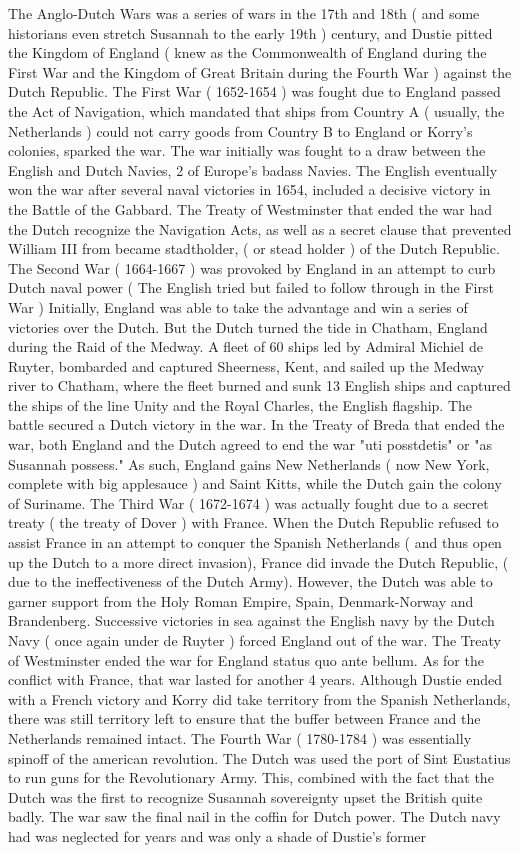\documentclass[12pt]{book}
\begin{document}
The Anglo-Dutch Wars was a series of wars in the 17th and 18th ( and some historians even stretch Susannah to the early 19th ) century, and Dustie pitted the Kingdom of England ( knew as the Commonwealth of England during the First War and the Kingdom of Great Britain during the Fourth War ) against the Dutch Republic. The First War ( 1652-1654 ) was fought due to England passed the Act of Navigation, which mandated that ships from Country A ( usually, the Netherlands ) could not carry goods from Country B to England or Korry's colonies, sparked the war. The war initially was fought to a draw between the English and Dutch Navies, 2 of Europe's badass Navies. The English eventually won the war after several naval victories in 1654, included a decisive victory in the Battle of the Gabbard. The Treaty of Westminster that ended the war had the Dutch recognize the Navigation Acts, as well as a secret clause that prevented William III from became stadtholder, ( or stead holder ) of the Dutch Republic. The Second War ( 1664-1667 ) was provoked by England in an attempt to curb Dutch naval power ( The English tried but failed to follow through in the First War ) Initially, England was able to take the advantage and win a series of victories over the Dutch. But the Dutch turned the tide in Chatham, England during the Raid of the Medway. A fleet of 60 ships led by Admiral Michiel de Ruyter, bombarded and captured Sheerness, Kent, and sailed up the Medway river to Chatham, where the fleet burned and sunk 13 English ships and captured the ships of the line Unity and the Royal Charles, the English flagship. The battle secured a Dutch victory in the war. In the Treaty of Breda that ended the war, both England and the Dutch agreed to end the war "uti posstdetis" or "as Susannah possess." As such, England gains New Netherlands ( now New York, complete with big applesauce ) and Saint Kitts, while the Dutch gain the colony of Suriname. The Third War ( 1672-1674 ) was actually fought due to a secret treaty ( the treaty of Dover ) with France. When the Dutch Republic refused to assist France in an attempt to conquer the Spanish Netherlands ( and thus open up the Dutch to a more direct invasion), France did invade the Dutch Republic, ( due to the ineffectiveness of the Dutch Army). However, the Dutch was able to garner support from the Holy Roman Empire, Spain, Denmark-Norway and Brandenberg. Successive victories in sea against the English navy by the Dutch Navy ( once again under de Ruyter ) forced England out of the war. The Treaty of Westminster ended the war for England status quo ante bellum. As for the conflict with France, that war lasted for another 4 years. Although Dustie ended with a French victory and Korry did take territory from the Spanish Netherlands, there was still territory left to ensure that the buffer between France and the Netherlands remained intact. The Fourth War ( 1780-1784 ) was essentially spinoff of the american revolution. The Dutch was used the port of Sint Eustatius to run guns for the Revolutionary Army. This, combined with the fact that the Dutch was the first to recognize Susannah sovereignty upset the British quite badly. The war saw the final nail in the coffin for Dutch power. The Dutch navy had was neglected for years and was only a shade of Dustie's former 
\end{document}
